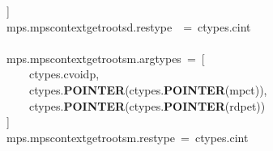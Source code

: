 \documentclass{article}\usepackage[]{graphicx}\usepackage[dvipsnames,table]{xcolor}
\makeatletter
\newcommand{\hlopt}[1]{\textcolor[rgb]{0,0,0}{#1}}%
\newcommand{\hldef}[1]{\textcolor[rgb]{0.345,0.345,0.345}{#1}}%
\newcommand{\hlkwd}[1]{\textcolor[rgb]{0.737,0.353,0.396}{\textbf{#1}}}%
\newenvironment{kframe}{%
 \def\at@end@of@kframe{}%
 \ifinner\ifhmode%
  \def\at@end@of@kframe{\end{minipage}}%
  \begin{minipage}{\columnwidth}%
 \fi\fi%
 \def\FrameCommand##1{\hskip\@totalleftmargin \hskip-\fboxsep
 \colorbox{shadecolor}{##1}\hskip-\fboxsep
     \hskip-\linewidth \hskip-\@totalleftmargin \hskip\columnwidth}%
 \MakeFramed {\advance\hsize-\width
   \@totalleftmargin\z@ \linewidth\hsize
   \@setminipage}}%
 {\par\unskip\endMakeFramed%
 \at@end@of@kframe}
\newenvironment{knitrout}{}{} %
\makeatother
\begin{document}
\begin{center}
\begin{minipage}[m]{15cm}
\begin{knitrout}
\begin{kframe}
\hldef{}\hlopt{{]}\ }\hspace*{\fill}\\
\hldef{\textunderscore mps}\hlopt{.}\hldef{mps\textunderscore context\textunderscore get\textunderscore roots\textunderscore d}\hlopt{.}\hldef{restype}\hldef{\ \ }\hldef{}\hlopt{=\ }\hldef{ctypes}\hlopt{.}\hldef{c\textunderscore int}\hspace*{\fill}\\
\hldef{}\hspace*{\fill}\\
\hldef{\textunderscore mps}\hlopt{.}\hldef{mps\textunderscore context\textunderscore get\textunderscore roots\textunderscore m}\hlopt{.}\hldef{argtypes\ }\hlopt{=\ {[}}\hspace*{\fill}\\
\hldef{}\hldef{\ \ \ \ }\hldef{ctypes}\hlopt{.}\hldef{c\textunderscore void\textunderscore p}\hlopt{,\ }\hldef{}\hspace*{\fill}\\
\hldef{}\hldef{\ \ \ \ }\hldef{ctypes}\hlopt{.}\hldef{}\hlkwd{POINTER}\hldef{}\hlopt{(}\hldef{ctypes}\hlopt{.}\hldef{}\hlkwd{POINTER}\hldef{}\hlopt{(}\hldef{mpc\textunderscore t}\hlopt{)),\ }\hldef{}\hspace*{\fill}\\
\hldef{}\hldef{\ \ \ \ }\hldef{ctypes}\hlopt{.}\hldef{}\hlkwd{POINTER}\hldef{}\hlopt{(}\hldef{ctypes}\hlopt{.}\hldef{}\hlkwd{POINTER}\hldef{}\hlopt{(}\hldef{rdpe\textunderscore t}\hlopt{))\ }\hldef{}\hspace*{\fill}\\
\hldef{}\hlopt{{]}}\hspace*{\fill}\\
\hldef{\textunderscore mps}\hlopt{.}\hldef{mps\textunderscore context\textunderscore get\textunderscore roots\textunderscore m}\hlopt{.}\hldef{restype\ }\hlopt{=\ }\hldef{ctypes}\hlopt{.}\hldef{c\textunderscore int}\hspace*{\fill}
\mbox{}
\normalfont
\end{kframe}
\end{knitrout}
\end{minipage}
\end{center}

\newpage
\end{document}
